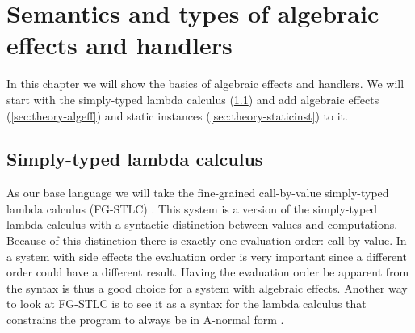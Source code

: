 {
\newcommand\synchange[1]{\colorbox{lightgray}{$#1$}}

\newcommand\eff[0]{\epsilon}
\newcommand\Eff[0]{E}
\newcommand\Op[1]{O^{#1}}

\newcommand\ty[0]{\tau}
\newcommand\tunit[0]{()}
\newcommand\tarr[2]{#1 \rightarrow #2}
\newcommand\thandler[2]{#1 \Rightarrow #2}
\newcommand\tforall[3]{\forall(#1:#2) . #3}
\newcommand\tinst[1]{\mathsf{inst}(#1)}

\newcommand\cty[0]{\underline{\ty}}
\newcommand\aty[2]{#1 \; ! \; #2}
\newcommand\texists[3]{\exists(#1:#2) . #3}
\newcommand\texistss[2]{\exists \overrightarrow{#1} . #2}
\newcommand\val[0]{\nu}
\newcommand\vunit[0]{()}
\newcommand\vinst[0]{\iota}
\newcommand\vabst[3]{\Lambda(#1:#2) . #3}
\newcommand\vabs[2]{\lambda #1 . #2}
\newcommand\vappt[2]{#1 \; [ #2 ]}

\newcommand\comp[0]{c}
\newcommand\creturn[1]{\mathsf{return} \; #1}
\newcommand\capp[2]{#1 \; #2}
\newcommand\cdo[3]{#1 \leftarrow #2 ; #3}
\newcommand\cop[2]{#1(#2)}
\newcommand\copi[3]{#1 \# #2(#3)}
\newcommand\chandle[2]{\mathsf{handle} (#1) \{ #2 \}}
\newcommand\chandlei[3]{\mathsf{handle}^{#1} (#2) \{ #3 \}}
\newcommand\cnew[1]{\mathsf{new} \; #1}
\newcommand\cunpack[4]{(#1, #2) \leftarrow #3 ; #4}

\newcommand\hop[5]{#1 \; #2 \; #3 \rightarrow #4 ; \; #5}
\newcommand\hreturn[2]{\mathsf{return}\; #1 \rightarrow #2}
\newcommand\hopc[4]{#1 \; #2 \; #3 \rightarrow #4}

\chapter{\label{chap:algtheory}Semantics and types of algebraic effects and handlers}

In this chapter we will show the basics of algebraic effects and handlers. We will start with the simply-typed lambda calculus (\cref{sec:theory-stlc}) and add algebraic effects (\cref{sec:theory-algeff}) and static instances (\cref{sec:theory-staticinst}) to it.

\section{Simply-typed lambda calculus} \label{sec:theory-stlc}

As our base language we will take the fine-grained call-by-value simply-typed lambda calculus (FG-STLC) \autocite{fg-stlc}.
This system is a version of the simply-typed lambda calculus with a syntactic distinction between values and computations.
Because of this distinction there is exactly one evaluation order: call-by-value.
In a system with side effects the evaluation order is very important since a different order could have a different result.
Having the evaluation order be apparent from the syntax is thus a good choice for a system with algebraic effects.
Another way to look at FG-STLC is to see it as a syntax for the lambda calculus that constrains the program to always be in A-normal form \autocite{anormalform}.

}
